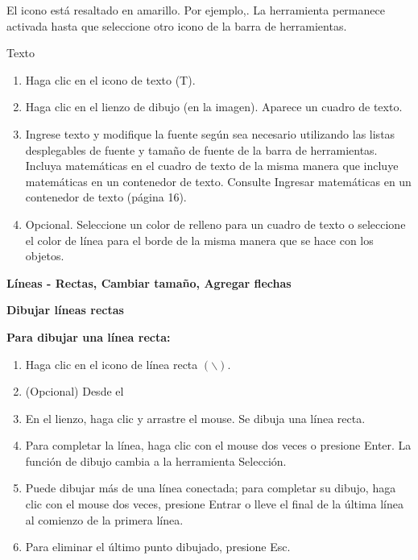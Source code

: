 El icono está resaltado en amarillo. Por ejemplo,. La herramienta permanece activada hasta que seleccione otro icono de la barra de herramientas.

Texto






\begin{enumerate}
  \item Haga clic en el icono de texto (T).

\item Haga clic en el lienzo de dibujo (en la imagen). Aparece un cuadro de texto.

\item Ingrese texto y modifique la fuente según sea necesario utilizando las listas desplegables de fuente y tamaño de fuente de la barra de herramientas. Incluya matemáticas en el cuadro de texto de la misma manera que incluye matemáticas en un contenedor de texto. Consulte Ingresar matemáticas en un contenedor de texto (página 16).

\item Opcional. Seleccione un color de relleno para un cuadro de texto o seleccione el color de línea para el borde de la misma manera que se hace con los objetos.
\end{enumerate}

\textbf{Líneas - Rectas, Cambiar tamaño, Agregar flechas}

\textbf{Dibujar líneas rectas}

\textbf{Para dibujar una línea recta:}

\begin{enumerate}
  \item Haga clic en el icono de línea recta $(\backslash)$.
 
 \item (Opcional) Desde el

\end{enumerate}


\begin{enumerate}
  \setcounter{enumi}{2}
  \item En el lienzo, haga clic y arrastre el mouse. Se dibuja una línea recta.

\item Para completar la línea, haga clic con el mouse dos veces o presione Enter. La función de dibujo cambia a la herramienta Selección.

\item Puede dibujar más de una línea conectada; para completar su dibujo, haga clic con el mouse dos veces, presione Entrar o lleve el final de la última línea al comienzo de la primera línea.

\item Para eliminar el último punto dibujado, presione Esc.
\end{enumerate}

